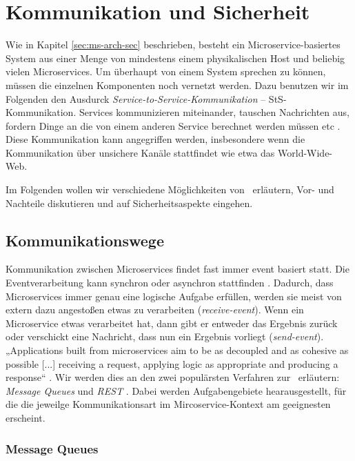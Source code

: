 \section{Kommunikation und Sicherheit}

Wie in Kapitel \ref{sec:ms-arch-sec} beschrieben, besteht ein Microservice-basiertes System aus einer Menge von mindestens einem physikalischen Host und beliebig vielen Microservices. Um überhaupt von einem System sprechen zu können, müssen die einzelnen Komponenten noch vernetzt werden. Dazu benutzen wir im Folgenden den Ausdurck \textit{Service-to-Service-Kommunikation} -- StS-Kommunikation. Services kommunizieren miteinander, tauschen Nachrichten aus, fordern Dinge an die von einem anderen Service berechnet werden müssen etc \cite{newman2015}. Diese Kommunikation kann angegriffen werden, insbesondere wenn die Kommunikation über unsichere Kanäle stattfindet wie etwa das World-Wide-Web.

Im Folgenden wollen wir verschiedene Möglichkeiten von \stscom\ erläutern, Vor- und Nachteile diskutieren und auf Sicherheitsaspekte eingehen.

\subsection{Kommunikationswege}

Kommunikation zwischen Microservices findet fast immer event basiert statt. Die Eventverarbeitung kann synchron oder asynchron stattfinden \cite{newman2015}. Dadurch, dass Microservices immer genau eine logische Aufgabe erfüllen, werden sie meist von extern dazu angestoßen etwas zu verarbeiten (\textit{receive-event}). Wenn ein Microservice etwas verarbeitet hat, dann gibt er entweder das Ergebnis zurück oder verschickt eine Nachricht, dass nun ein Ergebnis vorliegt (\textit{send-event}). „Applications built from microservices aim to be as decoupled and as cohesive as possible [...] receiving a request, applying logic as appropriate and producing a response“ \cite{Fowler+14}. Wir werden dies an den zwei populärsten Verfahren zur \stscom\ erläutern: \textit{Message Queues} und \textit{REST} \cite{newman2015}. Dabei werden Aufgabengebiete hearausgestellt, für die die jeweilge Kommunikationsart im Mircoservice-Kontext am geeignesten erscheint.

\subsubsection{Message Queues}

